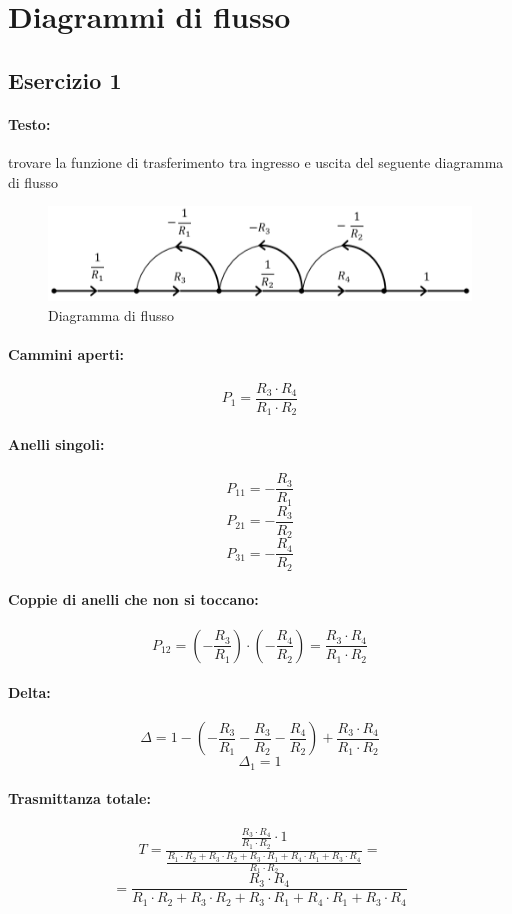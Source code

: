 \documentclass[a4paper,oneside,titlepage]{book}
\begin{document}
\newpage
\section{Diagrammi di flusso}

\subsection{Esercizio 1}
\paragraph{Testo:}
trovare la funzione di trasferimento tra ingresso e uscita del seguente diagramma di flusso
\begin{figure}[htp]
	\centering
	\includegraphics[width=\textwidth, height=\textheight, keepaspectratio]{flusso.png}
	\caption{Diagramma di flusso}
	\label{fig:flusso}
\end{figure}

\paragraph{Cammini aperti:}
\[ P_1 = \frac{R_3 \cdot R_4}{R_1 \cdot R_2} \]
\paragraph{Anelli singoli:}
\[ P_{11} = - \frac{R_3}{R_1} \]
\[ P_{21} = - \frac{R_3}{R_2} \]
\[ P_{31} = - \frac{R_4}{R_2} \]
\paragraph{Coppie di anelli che non si toccano:}
\[ P_{12} = \left( - \frac{R_3}{R_1} \right) \cdot \left( - \frac{R_4}{R_2} \right) = \frac{R_3 \cdot R_4}{R_1 \cdot R_2} \]
\paragraph{Delta:}
\[ \Delta = 1 - \left( - \frac{R_3}{R_1} - \frac{R_3}{R_2} - \frac{R_4}{R_2} \right) + \frac{R_3 \cdot R_4}{R_1 \cdot R_2} \]
\[ \Delta_1 = 1 \]
\paragraph{Trasmittanza totale:}
\[
T = \frac{\frac{R_3 \cdot R_4}{R_1 \cdot R_2} \cdot 1}{\frac{R_1 \cdot R_2 + R_3 \cdot R_2 + R_3 \cdot R_1 + R_4 \cdot R_1 + R_3 \cdot R_4}{R_1 \cdot R_2}} = \]
\[ = \frac{R_3 \cdot R_4}{R_1 \cdot R_2 + R_3 \cdot R_2 + R_3 \cdot R_1 + R_4 \cdot R_1 + R_3 \cdot R_4}
\]
\end{document}
